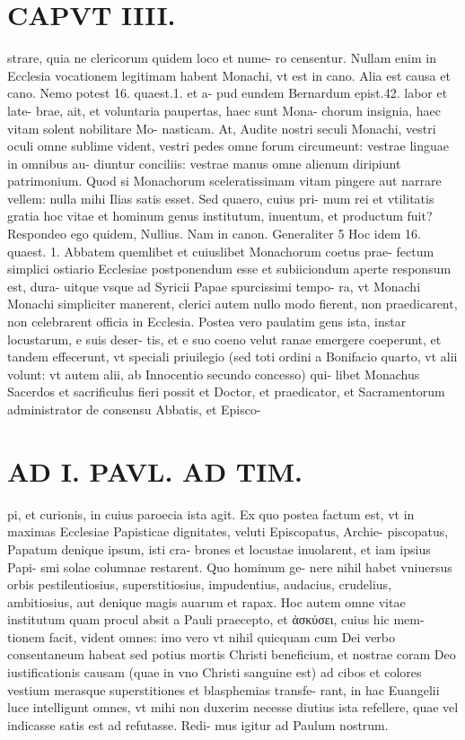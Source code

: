\documentclass{article}
\begin{document}
\begin{pages}
\section*{CAPVT  IIII. }
\marginpar{[ p.223 ]}\pstart strare, quia ne clericorum quidem loco et nume- ro censentur. Nullam enim in Ecclesia vocationem legitimam habent Monachi, vt est in cano. Alia est causa et cano. Nemo potest 16. quaest.1. et a- pud eundem Bernardum epist.42. labor et late- brae, ait, et voluntaria paupertas, haec sunt Mona- chorum insignia, haec vitam solent nobilitare Mo- nasticam. At, Audite nostri seculi Monachi, vestri oculi omne sublime vident, vestri pedes omne forum circumeunt: vestrae linguae in omnibus au- diuntur conciliis: vestrae manus omne alienum diripiunt patrimonium. Quod si Monachorum sceleratissimam vitam pingere aut narrare vellem: nulla mihi Ilias satis esset. Sed quaero, cuius pri- mum rei et vtilitatis gratia hoc vitae et hominum genus institutum, inuentum, et productum fuit? Respondeo ego quidem, Nullius. Nam in canon. Generaliter 5 Hoc idem 16. quaest. 1. Abbatem quemlibet et cuiuslibet Monachorum coetus prae- fectum simplici ostiario Ecclesiae postponendum esse et subiiciondum aperte responsum est, dura- uitque vsque ad Syricii Papae spurcissimi tempo- ra, vt Monachi Monachi simpliciter manerent, clerici autem nullo modo fierent, non praedicarent, non celebrarent officia in Ecclesia. Postea vero paulatim gens ista, instar locustarum, e suis deser- tis, et e suo coeno velut ranae emergere coeperunt, et tandem effecerunt, vt speciali priuilegio (sed toti ordini a Bonifacio quarto, vt alii volunt: vt autem alii, ab Innocentio secundo concesso) qui- libet Monachus Sacerdos et sacrificulus fieri possit et Doctor, et praedicator, et Sacramentorum administrator de consensu Abbatis, et Episco-  \pend
\section*{AD I. PAVL. AD TIM. }
\marginpar{[ p.224 ]}\pstart pi, et curionis, in cuius paroecia ista agit. Ex quo postea factum est, vt in maximas Ecclesiae Papisticae dignitates, veluti Episcopatus, Archie- piscopatus, Papatum denique ipsum, isti cra- brones et locustae inuolarent, et iam ipsius Papi- smi solae columnae restarent. Quo hominum ge- nere nihil habet vniuersus orbis pestilentiosius, superstitiosius, impudentius, audacius, crudelius, ambitiosius, aut denique magis auarum et rapax. Hoc autem omne vitae institutum quam procul absit a Pauli praecepto, et ἀσκύσει, cuius hic mem- tionem facit, vident omnes: imo vero vt nihil quicquam cum Dei verbo consentaneum habeat sed potius mortis Christi beneficium, et nostrae coram Deo iustificationis causam (quae in vno Christi sanguine est) ad cibos et colores vestium merasque superstitiones et blasphemias transfe- rant, in hac Euangelii luce intelligunt omnes, vt mihi non duxerim necesse diutius ista refellere, quae vel indicasse satis est ad refutasse. Redi- mus igitur ad Paulum nostrum.  \pend
{}
{}

\end{pages}
\end{document}
